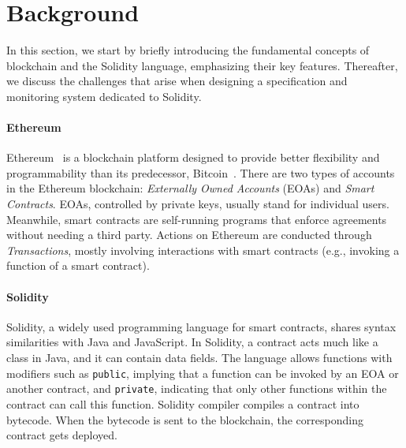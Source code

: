 \section{Background} 
\label{sec:background}


In this section, we start by briefly introducing the fundamental concepts of blockchain and the Solidity language, emphasizing their key features. 
Thereafter, we discuss the challenges that arise when designing a specification and monitoring system dedicated to Solidity.

\paragraph{Ethereum}
Ethereum~\cite{buterin2014next} is a blockchain platform designed to  provide better flexibility and programmability than its predecessor, Bitcoin~\cite{nakamoto2008bitcoin}.
There are two types of accounts in the Ethereum blockchain: \textit{Externally Owned Accounts} (EOAs) and \textit{Smart Contracts}. 
EOAs, controlled by private keys, usually stand for individual users. Meanwhile, smart contracts are self-running programs that enforce agreements without needing a third party.
Actions on Ethereum are conducted through \textit{Transactions}, mostly involving interactions with smart contracts (e.g., invoking a function of a smart contract).
 
\paragraph{Solidity}
Solidity, a widely used programming language for smart contracts, shares syntax similarities with Java and JavaScript. 
In Solidity, a contract acts much like a class in Java, and it can contain data fields. 
The language allows functions with modifiers such as \texttt{public}, implying that a function can be invoked by an EOA or another contract, and \texttt{private}, indicating that only other functions within the contract can call this function. 
Solidity compiler compiles a contract into bytecode.
When the bytecode is sent to the blockchain, the corresponding contract gets deployed.

